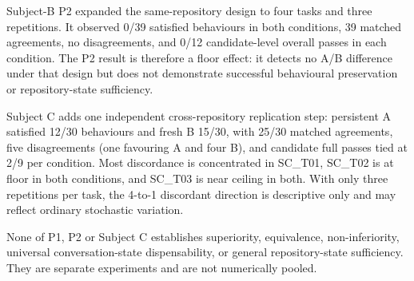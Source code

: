 Subject-B P2 expanded the same-repository design to four tasks and three repetitions. It observed 0/39 satisfied behaviours in both conditions, 39 matched agreements, no disagreements, and 0/12 candidate-level overall passes in each condition. The P2 result is therefore a floor effect: it detects no A/B difference under that design but does not demonstrate successful behavioural preservation or repository-state sufficiency.

Subject C adds one independent cross-repository replication step: persistent A satisfied 12/30 behaviours and fresh B 15/30, with 25/30 matched agreements, five disagreements (one favouring A and four B), and candidate full passes tied at 2/9 per condition. Most discordance is concentrated in SC\_T01, SC\_T02 is at floor in both conditions, and SC\_T03 is near ceiling in both. With only three repetitions per task, the 4-to-1 discordant direction is descriptive only and may reflect ordinary stochastic variation.

None of P1, P2 or Subject C establishes superiority, equivalence, non-inferiority, universal conversation-state dispensability, or general repository-state sufficiency. They are separate experiments and are not numerically pooled.
